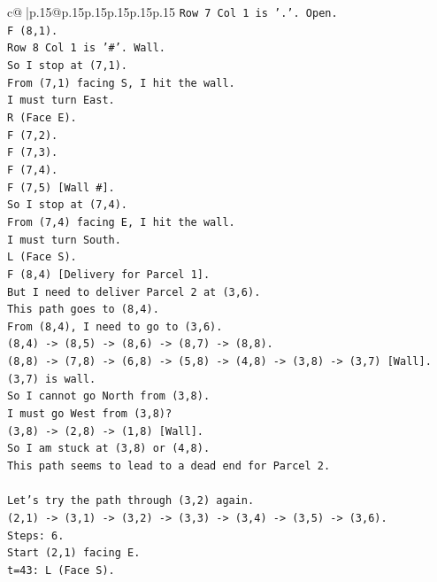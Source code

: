 \documentclass{article}
\begin{document}
{\begin{supertabular}{c@{$\;$}|p{.15\linewidth}@{}p{.15\linewidth}p{.15\linewidth}p{.15\linewidth}p{.15\linewidth}p{.15\linewidth}}
{{{\texttt{Row 7 Col 1 is '.'. Open.} \\
\texttt{F (8,1).} \\
\texttt{Row 8 Col 1 is '\#'. Wall.} \\
\texttt{So I stop at (7,1).} \\
\texttt{From (7,1) facing S, I hit the wall.} \\
\texttt{I must turn East.} \\
\texttt{R (Face E).} \\
\texttt{F (7,2).} \\
\texttt{F (7,3).} \\
\texttt{F (7,4).} \\
\texttt{F (7,5) {[}Wall \#{]}.} \\
\texttt{So I stop at (7,4).} \\
\texttt{From (7,4) facing E, I hit the wall.} \\
\texttt{I must turn South.} \\
\texttt{L (Face S).} \\
\texttt{F (8,4) {[}Delivery for Parcel 1{]}.} \\
\texttt{But I need to deliver Parcel 2 at (3,6).} \\
\texttt{This path goes to (8,4).} \\
\texttt{From (8,4), I need to go to (3,6).} \\
\texttt{(8,4) {-}> (8,5) {-}> (8,6) {-}> (8,7) {-}> (8,8).} \\
\texttt{(8,8) {-}> (7,8) {-}> (6,8) {-}> (5,8) {-}> (4,8) {-}> (3,8) {-}> (3,7) {[}Wall{]}.} \\
\texttt{(3,7) is wall.} \\
\texttt{So I cannot go North from (3,8).} \\
\texttt{I must go West from (3,8)?} \\
\texttt{(3,8) {-}> (2,8) {-}> (1,8) {[}Wall{]}.} \\
\texttt{So I am stuck at (3,8) or (4,8).} \\
\texttt{This path seems to lead to a dead end for Parcel 2.} \\
\\ 
\texttt{Let's try the path through (3,2) again.} \\
\texttt{(2,1) {-}> (3,1) {-}> (3,2) {-}> (3,3) {-}> (3,4) {-}> (3,5) {-}> (3,6).} \\
\texttt{Steps: 6.} \\
\texttt{Start (2,1) facing E.} \\
\texttt{t=43: L (Face S).} \\
}}}
\end{supertabular}}
\end{document}
